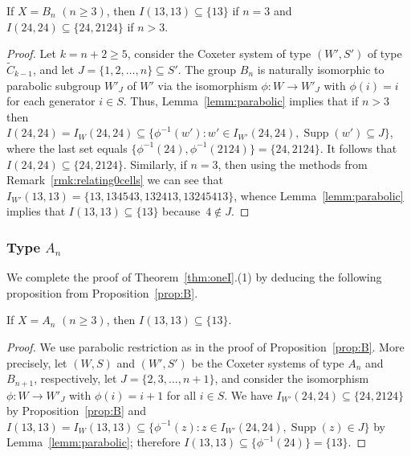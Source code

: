 \documentclass[ALCO,Unicode,published]{cedram}
\newcommand{\ra}{\rightarrow}
\newcommand{\se}{\subseteq}
\newcommand{\inverse}{^{-1}}
\DeclareMathOperator{\supp}{\mathrm{Supp}}
\begin{document}
\begin{prop}
    \label{prop:B}
    If $X=B_n$ $(n\ge 3)$, then $I(13,13)\se \{13\}$ if $n=3$ and $I(24,24)\se \{24,2124\}$ if $n>3$.
\end{prop}
\begin{proof} 
    Let $k=n+2\ge 5$, consider the Coxeter system of type $(W',S')$ of type~$\tilde C_{k-1}$, and
    let $J=\{1,2,\dots,n\}\se S'$. The group $B_n$ is naturally isomorphic to parabolic subgroup
    $W'_J$ of $W'$ via the isomorphism $\phi: W\ra W'_J$ with $\phi(i)=i$ for each generator $i\in
    S$. Thus, Lemma~\ref{lemm:parabolic} implies that if $n>3$ then $I(24,24)=I_{W}(24,24)\se
    \{\phi\inverse(w'):w'\in I_{W'}(24,24),\supp(w')\se J\}$, where the last set equals
    $\{\phi\inverse(24),\phi\inverse(2124)\}=\{24,2124\}$. It follows that $I(24,24)\se
    \{24,2124\}$. Similarly, if $n=3$, then using the methods from Remark~\ref{rmk:relating0cells} we can
    see that $I_{W'}(13,13)=\{13,134543,132413, 13245413\}$, whence Lemma~\ref{lemm:parabolic} implies
    that $I(13,13)\se \{13\}$ because~$4\notin J$.
\end{proof} 

\subsubsection{Type $A_n$}
We complete the proof of Theorem~\ref{thm:oneI}.(1) by deducing the following proposition from Proposition~\ref{prop:B}.
\begin{prop}
    \label{prop:A} If $X=A_n$ $(n\ge 3)$, then $I(13,13)\se \{13\}$.
\end{prop}
\begin{proof} 
    We use parabolic restriction as in the proof of Proposition~\ref{prop:B}. More precisely, let $(W,S)$ and
    $(W',S')$ be the Coxeter systems of type $A_n$ and $B_{n+1}$, respectively, let $J=\{2,3,\dots,
    n+1\}$, and consider the isomorphism $\phi:W\ra W'_{J}$ with $\phi(i)=i+1$ for all $i\in S$.  We
    have $I_{W'}(24,24)\se\{24,2124\}$ by Proposition~\ref{prop:B} and $I(13,13)=I_{W}(13,13)\se
    \{\phi\inverse(z):z\in I_{W'}(24,24), \supp(z)\in J\}$ by  Lemma~\ref{lemm:parabolic}; therefore
    $I(13,13)\se\{\phi\inverse(24)\}=\{13\}$.
\end{proof}
\end{document}
